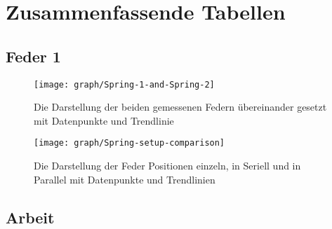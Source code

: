\documentclass[../main.tex]{subfiles} %
\begin{document}
\chapter{Zusammenfassende Tabellen}\label{ch:zusammenfassende-tabellen}

        \section{Feder 1}\label{sec:feder-1}
    \begin{figure}[H]
        \centering
        \texttt{[image: graph/Spring-1-and-Spring-2]}
        \caption{Die Darstellung der beiden gemessenen Federn übereinander gesetzt mit Datenpunkte und Trendlinie}
        \label{fig:graph-single-spring-comparisons}
    \end{figure}
    \begin{figure}[H]
        \centering
        \texttt{[image: graph/Spring-setup-comparison]}
        \caption{Die Darstellung der Feder Positionen einzeln, in Seriell und in Parallel mit Datenpunkte und Trendlinien}
        \label{fig:graph-spring-setup-comparisons}
    \end{figure}
    \section{Arbeit}\label{sec:arbeit}
\end{document}
